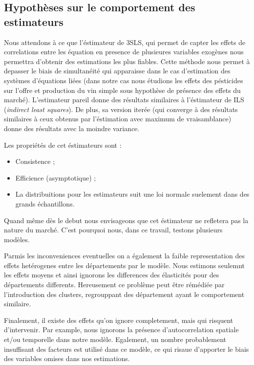 \documentclass[11pt,]{article}
\providecommand{\tightlist}{%
  \setlength{\itemsep}{0pt}\setlength{\parskip}{0pt}}
\begin{document}
\hypertarget{hypotheses-sur-le-comportement-des-estimateurs}{%
\subsection{Hypothèses sur le comportement des
estimateurs}\label{hypotheses-sur-le-comportement-des-estimateurs}}

Nous attendons à ce que l'éstimateur de 3SLS, qui permet de capter les
effets de correlations entre les équation en presence de plusieures
variables exogènes nous permettra d'obtenir des estimations les plus
fiables. Cette méthode nous permet à depasser le biais de simultanéité
qui apparaisse dans le cas d'estimation des systèmes d'équations liées
(dans notre cas nous étudions les effets des pésticides sur l'offre et
production du vin simple sous hypothèse de présence des effets du
marché). L'estimateur pareil donne des résultats similaires à
l'éstimateur de ILS (\emph{indirect least squares}). De plus, sa version
iterée (qui converge à des résultats similaires à ceux obtenus par
l'éstimation avec maximum de vraisamblance) donne des résultats avec la
moindre variance.

Les propriétés de cet éstimateurs sont :

\begin{itemize}
\tightlist
\item
  Consistence ;
\item
  Efficience (asymptotique) ;
\item
  La distribuitions pour les estimateurs suit une loi normale suelement
  dans des grands échantillons.
\end{itemize}

Quand même dès le debut nous envisageons que cet éstimateur ne refletera
pas la nature du marché. C'est pourquoi nous, dans ce travail, testons
plusieurs modèles.

Parmis les inconveniences eventuelles on a également la faible
representation des effets hetérogenes entre les départements par le
modèle. Nous estimons seulemnt les effets moyens et ainsi ignorons les
differences des élasticités pour des départements differents.
Hereusement ce problème peut être rémédiée par l'introduction des
clusters, regrouppant des département ayant le comportement similaire.

Finalement, il existe des effets qu'on ignore completement, mais qui
risquent d'intervenir. Par example, nous ignorons la présence
d'autocorrelation spatiale et/ou temporelle dans notre modèle.
Egalement, un nombre probablement insuffisant des facteurs est utilisé
dans ce modèle, ce qui risaue d'apporter le biais des variables omises
dans nos estimations.
\end{document}
